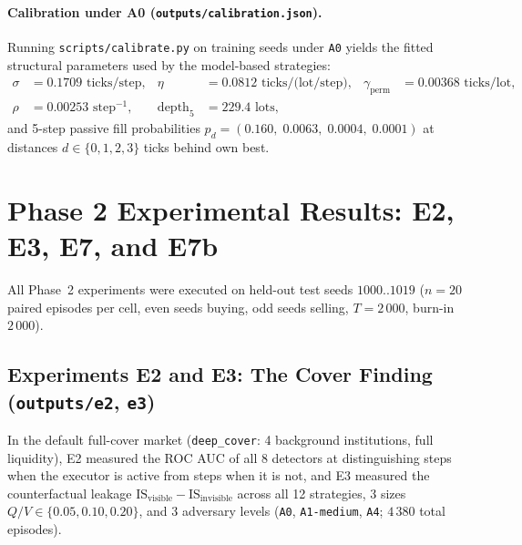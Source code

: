 \documentclass[11pt,a4paper]{article}
\newcommand{\code}[1]{\texttt{#1}}
\begin{document}
\paragraph{Calibration under A0 (\code{outputs/calibration.json}).} Running \code{scripts/calibrate.py} on
training seeds under \code{A0} yields the fitted structural parameters used by the model-based strategies:
\begin{align*}
  \sigma &= 0.1709\text{ ticks/step}, &
  \eta &= 0.0812\text{ ticks/(lot/step)}, &
  \gamma_{\text{perm}} &= 0.00368\text{ ticks/lot}, \\
  \rho &= 0.00253\text{ step}^{-1}, &
  \text{depth}_5 &= 229.4\text{ lots},
\end{align*}
and 5-step passive fill probabilities $p_d = (0.160,\; 0.0063,\; 0.0004,\; 0.0001)$ at distances
$d \in \{0, 1, 2, 3\}$ ticks behind own best.

\section{Phase 2 Experimental Results: E2, E3, E7, and E7b}
\label{sec:phase2_results}

All Phase~2 experiments were executed on held-out test seeds $1000..1019$ ($n = 20$ paired episodes per
cell, even seeds buying, odd seeds selling, $T = 2\,000$, burn-in $2\,000$).

\subsection[Experiments E2 and E3: The Cover Finding]{Experiments E2 and E3: The Cover Finding (\code{outputs/e2}, \code{e3})}
\label{sec:e3}

In the default full-cover market (\code{deep\_cover}: 4 background institutions, full liquidity), E2
measured the ROC AUC of all 8 detectors at distinguishing steps when the executor is active from steps
when it is not, and E3 measured the counterfactual leakage $\text{IS}_{\text{visible}} -
\text{IS}_{\text{invisible}}$ across all 12 strategies, 3 sizes $Q/V \in \{0.05, 0.10, 0.20\}$, and 3
adversary levels (\code{A0}, \code{A1-medium}, \code{A4}; $4\,380$ total episodes).
\end{document}
